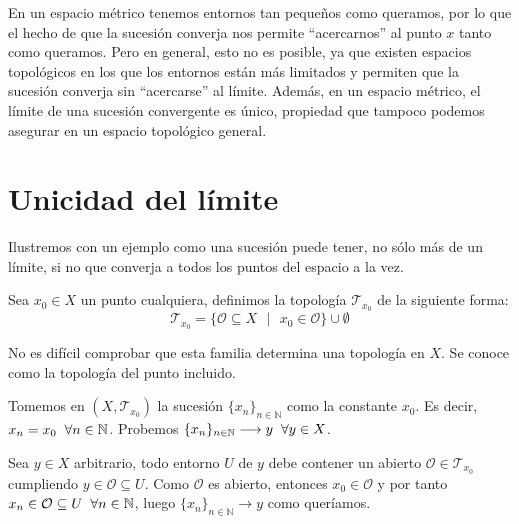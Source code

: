 \documentclass{article}
\begin{document}
\begin{justify} En un espacio métrico tenemos entornos tan pequeños
  como queramos, por lo que el hecho de que la sucesión converja nos
  permite ``acercarnos'' al punto $x$ tanto como queramos. Pero en
  general, esto no es posible, ya que existen espacios topológicos en
  los que los entornos están más limitados y permiten que la sucesión
  converja sin ``acercarse'' al límite. Además, en un espacio métrico,
  el límite de una sucesión convergente es único, propiedad que
  tampoco podemos asegurar en un espacio topológico general.
\end{justify}

\section*{Unicidad del límite}

\begin{justify} Ilustremos con un ejemplo como una sucesión puede
  tener, no sólo más de un límite, si no que converja a todos los puntos
  del espacio a la vez.
\end{justify}

\begin{justify} Sea $x_0 \in X$ un punto cualquiera, definimos la
  topología $\mathcal{T}_{x_0}$ de la siguiente forma:
  \[\mathcal{T}_{x_0} = \{\mathcal{O} \subseteq X \text{ }|\text{ }
    x_0 \in \mathcal{O}\} \cup \emptyset\]
\end{justify}

\begin{justify} No es difícil comprobar que esta familia determina una
  topología en $X$. Se conoce como la topología del punto incluido.
\end{justify}

\begin{justify} Tomemos en $(X, \mathcal{T}_{x_0})$ la sucesión
  $\{x_n\}_{n \in \mathbb{N}}$ como la constante $x_0$. Es decir, $x_n =
  x_0 \hspace{2mm} \forall n \in \mathbb{N}$. Probemos $\{x_n\}_{n \in
    \mathbb{N}} \longrightarrow y \hspace{2mm} \forall y \in X$.
\end{justify}

\begin{justify} Sea $y \in X$ arbitrario, todo entorno $U$ de $y$ debe
  contener un abierto $\mathcal{O} \in \mathcal{T}_{x_0}$ cumpliendo $y
  \in \mathcal{O} \subseteq U$. Como $\mathcal{O}$ es abierto, entonces
  $x_0 \in \mathcal{O}$ y por tanto $x_n \in \mathcal{O} \subseteq U
  \hspace{2mm} \forall n \in \mathbb{N}$, luego $\{x_n\}_{n \in
    \mathbb{N}} \longrightarrow y$ como queríamos.
\end{justify}
\end{document}
